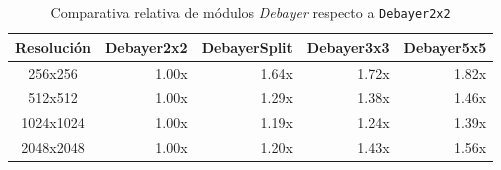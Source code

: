 \begin{table}[htbp]
\centering
\renewcommand{\arraystretch}{1.2}
\setlength{\tabcolsep}{7pt}
\begin{tabular}{|c|r|r|r|r|}
\hline
\rowcolor[gray]{0.90}
\textbf{Resolución} & \textbf{Debayer2x2} & \textbf{DebayerSplit} & \textbf{Debayer3x3} & \textbf{Debayer5x5} \\
\hline
256x256 & 1.00x & 1.64x & 1.72x & 1.82x \\
\hline
512x512 & 1.00x & 1.29x & 1.38x & 1.46x \\
\hline
1024x1024 & 1.00x & 1.19x & 1.24x & 1.39x \\
\hline
2048x2048 & 1.00x & 1.20x & 1.43x & 1.56x \\
\hline
\end{tabular}
\caption{Comparativa relativa de módulos \textit{Debayer} respecto a \texttt{Debayer2x2}}
\label{tab:debayer_gpu_relative_vs_best_equipo1_float32}
\end{table}
